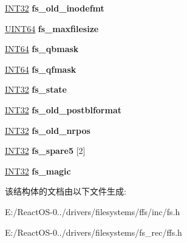 \begin{DoxyCompactItemize}
\mbox{\label{structfs_a64e93e8d307d648cd5c9eca296cc7adc}} 
\hyperlink{_processor_bind_8h_a1137216524060afd426c34677fed058b}{I\+N\+T32} {\bfseries fs\+\_\+old\+\_\+inodefmt}
\item 
\mbox{\label{structfs_a22d77e02b8e25fb5f272cb7e2fc478ab}} 
\hyperlink{_processor_bind_8h_a57be03562867144161c1bfee95ca8f7c}{U\+I\+N\+T64} {\bfseries fs\+\_\+maxfilesize}
\item 
\mbox{\label{structfs_ac8b5aabd5ff201e55dde57e67ee942bb}} 
\hyperlink{_processor_bind_8h_af16992cf571ce4103a92355761cc471e}{I\+N\+T64} {\bfseries fs\+\_\+qbmask}
\item 
\mbox{\label{structfs_a54b72f44e0fd9b371436e140e703f36d}} 
\hyperlink{_processor_bind_8h_af16992cf571ce4103a92355761cc471e}{I\+N\+T64} {\bfseries fs\+\_\+qfmask}
\item 
\mbox{\label{structfs_a020ee1cffff44ff33860271ecf0c746f}} 
\hyperlink{_processor_bind_8h_a1137216524060afd426c34677fed058b}{I\+N\+T32} {\bfseries fs\+\_\+state}
\item 
\mbox{\label{structfs_aa14757ca6a7e558435211c8f32e2b0eb}} 
\hyperlink{_processor_bind_8h_a1137216524060afd426c34677fed058b}{I\+N\+T32} {\bfseries fs\+\_\+old\+\_\+postblformat}
\item 
\mbox{\label{structfs_a6079b822da6c9ec955f65032eb737f68}} 
\hyperlink{_processor_bind_8h_a1137216524060afd426c34677fed058b}{I\+N\+T32} {\bfseries fs\+\_\+old\+\_\+nrpos}
\item 
\mbox{\label{structfs_a6a22ecdf83eabf8c13c50e92914a9642}} 
\hyperlink{_processor_bind_8h_a1137216524060afd426c34677fed058b}{I\+N\+T32} {\bfseries fs\+\_\+spare5} \mbox{[}2\mbox{]}
\item 
\mbox{\label{structfs_a78787a3ce16b996db913e22c4aff07f4}} 
\hyperlink{_processor_bind_8h_a1137216524060afd426c34677fed058b}{I\+N\+T32} {\bfseries fs\+\_\+magic}
\end{DoxyCompactItemize}


该结构体的文档由以下文件生成\+:\begin{DoxyCompactItemize}
\item 
E\+:/\+React\+O\+S-\/0../drivers/filesystems/ffs/inc/fs.\+h\item 
E\+:/\+React\+O\+S-\/0../drivers/filesystems/fs\+\_\+rec/ffs.\+h\end{DoxyCompactItemize}
